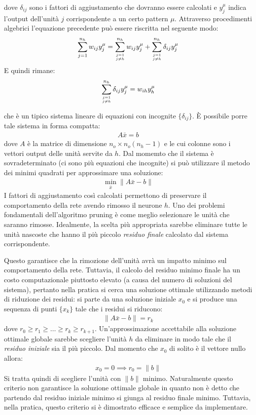 dove $\delta_{ij}$ sono i fattori di aggiustamento che dovranno essere calcolati e $y_j^\mu$ indica l'output dell'unità $j$ corrispondente a un certo pattern $\mu$.
Attraverso procedimenti algebrici l'equazione precedente può essere riscritta nel seguente modo:
\begin{align*}
	\sum_{j = 1}^{n_h}  w_{ij} y^\mu_j = 
	\sum_{j = 1 \atop j \neq h} ^ {n_h} w_{ij} y^\mu_j + 
	\sum_{j = 1 \atop j \neq h} ^ {n_h} \delta_{ij} y^\mu_j
\end{align*}
E quindi rimane:
\begin{align*}
	\sum_{j = 1 \atop j \neq h} ^ {n_h} \delta_{ij} y^\mu_j =
	w_{ih} y^\mu_h
\end{align*}

che è un tipico sistema lineare di equazioni con incognite $\{\delta_{ij}\}$. È possibile porre tale sistema in forma compatta:
\begin{align*}
	A \bar{x} = b
\end{align*}
dove $A$ è la matrice di dimensione $n_o \times n_o (n_h - 1)$ e le cui colonne sono i vettori output delle unità servite da $h$. Dal momemto che il sistema è sovradeterminato (ci sono più equazioni che incognite) si può utilizzare il metodo dei minimi quadrati per approssimare una soluzione:
\begin{align}
	\min_{\bar{x}} \|A \bar{x} - b\|
\end{align}
I fattori di aggiustamento così calcolati permettono di preservare il comportamento della rete avendo rimosso il neurone $h$. Uno dei problemi fondamentali dell'algoritmo pruning è come meglio selezionare le unità che saranno rimosse. Idealmente, la scelta più appropriata sarebbe eliminare tutte le unità nascoste che hanno il più piccolo \emph{residuo finale} calcolato dal sistema corrispondente.

\newpage

Questo garantisce che la rimozione dell'unità avrà un impatto minimo sul comportamento della rete. Tuttavia, il calcolo del residuo minimo finale ha un costo computazionale piuttosto elevato (a causa del numero di soluzioni del sistema), pertanto nella pratica si cerca una soluzione ottimale utilizzando metodi di riduzione dei residui: si parte da una soluzione iniziale $x_0$ e si produce una sequenza di punti $\{ x_k \}$ tale che i residui si riducono: 
\begin{align*}
	\|A \bar{x} - b\| = r_k
\end{align*}
dove $r_0 \geq r_1 \geq \dots \geq r_k \geq r_{k + 1}$. Un'approssimazione accettabile alla soluzione ottimale globale sarebbe scegliere l'unità $h$ da eliminare in modo tale che il \emph{residuo iniziale} sia il più piccolo. Dal momento che $x_0$ di solito è il vettore nullo allora:
\begin{align*}
	x_0 = 0 \implies r_0 = \| b \|
\end{align*}
Si tratta quindi di scegliere l'unità con $\| b \|$ minimo. Naturalmente questo criterio non garantisce la soluzione ottimale globale in quanto non è detto che partendo dal residuo iniziale minimo si giunga al residuo finale minimo. Tuttavia, nella pratica, questo criterio si è dimostrato efficace e semplice da implementare.\\

